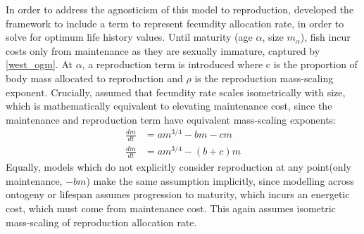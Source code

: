 \documentclass[a4paper]{article} %
\begin{document}
In order to address the agnosticism of this model to reproduction, \cite{Charnov2001} developed the framework to include a term to represent fecundity allocation rate, in order to solve for optimum life history values. Until maturity (age $\alpha$, size $m_{\alpha}$), fish incur costs only from maintenance as they are sexually immature, captured by \cref{west_ogm}. At $\alpha$, a reproduction term is introduced where c is the proportion of body mass allocated to reproduction and $\rho$ is the reproduction mass-scaling exponent. Crucially, \cite{charnov2001} assumed that fecundity rate scales isometrically with size, which is mathematically equivalent to elevating maintenance cost, since the maintenance and reproduction term have equivalent mass-scaling exponents:
\begin{align}
    \frac{dm}{dt} &= am^{3/4} - bm - cm \nonumber \\
    \frac{dm}{dt} &= am^{3/4} - (b+c)m \label{charnov}
\end{align}
Equally, models which do not explicitly consider reproduction at any point(only maintenance, $-bm$) make the same assumption implicitly, since modelling across ontogeny or lifespan assumes progression to maturity, which incurs an energetic cost, which must come from maintenance cost. This again assumes isometric mass-scaling of reproduction allocation rate.
\end{document}
